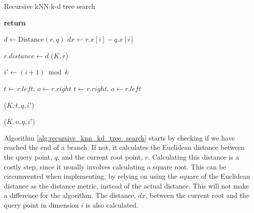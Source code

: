 \begin{algorithm}
\caption{Recursive kNN k-d tree search}
\label{alg:recursive_knn_kd_tree_search}
\begin{algorithmic}
         
            \State \textbf{return} 
        \EndIf

        \State $d \gets \text{Distance}(r, q)$
        \State $dx \gets r.x[i] - q.x[i]$

         
            \State $r.distance \gets d$
            \State {}($K, r$)
        \EndIf

        \State $i' \gets (i + 1) \bmod k$ 

          
            \State $t \gets r.left$, $o \gets r.right$
        \Else
            \State $t \gets r.right$, $o \gets r.left$
        \EndIf

        \State {}($K, t, q, i'$)

         
            \State {}($K, o, q, i'$)
        \EndIf
    \EndProcedure
\end{algorithmic}
\end{algorithm}

Algorithm \ref{alg:recursive_knn_kd_tree_search} starts by checking if we have reached the end of a branch. If not, it calculates the Euclidean distance between the query point, $q$, and the current root point, $r$. Calculating this distance is a costly step, since it usually involves calculating a square root. This can be circumvented when implementing, by relying on using the square of the Euclidean distance as the distance metric, instead of the actual distance. This will not make a difference for the algorithm. The distance, $dx$, between the current root and the query point in dimension $i$ is also calculated.

